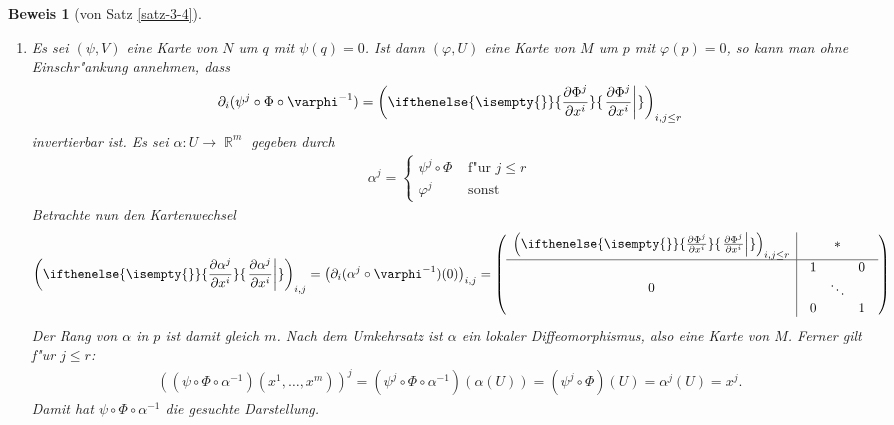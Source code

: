 \documentclass[paper=A4, twoside, chapterprefix=true, bibliography=totoc, headsepline]{scrbook}
\let\temp\phi{}
\let\phi\varphi{}
\let\varphi\temp{}
\let\temp\theta{}
\let\theta\vartheta{}
\let\vartheta\temp{}
\let\temp\epsilon{}
\let\epsilon\varepsilon{}
\let\varepsilon\temp{}
\let\temp\rho{}
\let\rho\varrho{}
\let\varrho\temp{}
\DeclareMathOperator{\R}{\mathbb{R}}
\newcommand{\pdifffrac}[3][]{\ifthenelse{\isempty{#1}}{\frac{\partial #2}{\partial #3}}{\left. \frac{\partial #2}{\partial #3} \right|_{#1}}}
\theoremstyle{plain}
\theoremstyle{nonumberplain}
\newtheorem{bew}{Beweis}
\theoremstyle{empty}
\theoremstyle{break}
\begin{document}

\begin{bew}[von Satz \ref{satz-3-4}] %
\begin{enumerate}[label=(\roman*),widest=ii,leftmargin=*]
  \item
  Es sei $(\psi, V)$ eine Karte von $N$ um $q$ mit $\psi(q) = 0$.
  Ist dann $(\phi, U)$ eine Karte von $M$ um $p$ mit $\phi(p) = 0$, so kann man ohne Einschr"ankung annehmen, dass 
  \begin{align*}
    \partial_i(\psi^j \circ \Phi \circ \phi^{-1}) = \left(\pdifffrac{\Phi^j}{x^i}\right)_{i,j \leq r} 
  \end{align*}
  invertierbar ist.
  Es sei $\alpha \colon U \to \R^m$ gegeben durch
  \begin{align*}
    \alpha^j =
    \begin{cases}
      \psi^j \circ \Phi & \text{ f"ur } j \leq r\\
      \phi^j & \text{ sonst}
    \end{cases}
  \end{align*}
  Betrachte nun den Kartenwechsel
  \begin{align*}
    \left(\pdifffrac{\alpha^j}{x^i}\right)_{i,j} = \left(\partial_i(\alpha^j \circ \phi^{-1})(0)\right)_{i,j} = \left(
      \begin{array}{c|c}
        \left(\pdifffrac{\Phi^j}{x^i}\right)_{i,j \le r} & \ast\\
        \hline
        0 & 
        \begin{array}{ccc}
          1 &&0\\
          &\ddots&\\
          0&&1
        \end{array}
      \end{array}\right)
  \end{align*}
  Der Rang von $\alpha$ in $p$ ist damit gleich $m$. Nach dem Umkehrsatz ist $\alpha$ ein lokaler Diffeomorphismus, also eine Karte von $M$. Ferner gilt f"ur $j \leq r$:
  \begin{align*}
    \left((\psi \circ \Phi \circ \alpha^{-1})(x^1,\ldots,x^m)\right)^j = (\psi^j \circ \Phi \circ \alpha^{-1})(\alpha(U)) = (\psi^j\circ \Phi)(U) = \alpha^j(U) = x^j.
  \end{align*}
  Damit hat $\psi \circ \Phi \circ \alpha^{-1}$ die gesuchte Darstellung.


\end{enumerate}
\end{bew}
\end{document}
